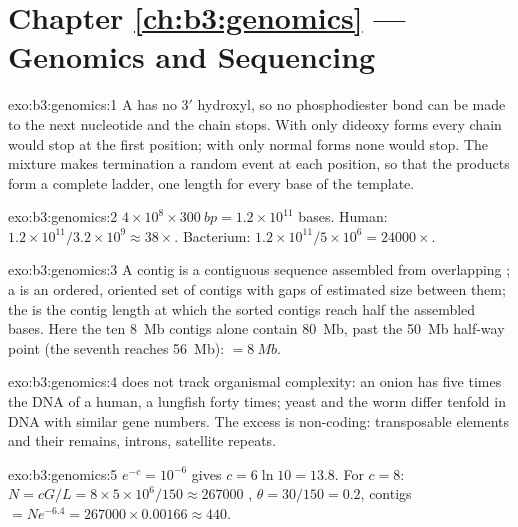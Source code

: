 \section*{Chapter \ref{ch:b3:genomics} --- Genomics and Sequencing}

\begin{solution}{exo:b3:genomics:1}
A  has no 3$'$ hydroxyl, so no phosphodiester bond
can be made to the next nucleotide and the chain stops. With only
dideoxy forms every chain would stop at the first position; with only
normal forms none would stop. The mixture makes termination a random
event at each position, so that the products form a complete ladder,
one length for every base of the template.
\end{solution}

\begin{solution}{exo:b3:genomics:2}
$4\times 10^{8}\times \qty{300}{bp} = 1.2\times 10^{11}$ bases. Human:
$1.2\times 10^{11}/3.2\times 10^{9} \approx 38\times$. Bacterium:
$1.2\times 10^{11}/5\times 10^{6} = \num{24000}\times$.
\end{solution}

\begin{solution}{exo:b3:genomics:3}
A contig is a contiguous sequence assembled from overlapping ; a
 is an ordered, oriented set of contigs with gaps of estimated
size between them; the  is the contig length at which the sorted
contigs reach half the assembled bases. Here the ten \qty{8}{Mb}
contigs alone contain \qty{80}{Mb}, past the \qty{50}{Mb} half-way
point (the seventh reaches \qty{56}{Mb}):  $= \qty{8}{Mb}$.
\end{solution}

\begin{solution}{exo:b3:genomics:4}
 does not track organismal complexity: an onion has five
times the DNA of a human, a lungfish forty times; yeast and the worm
differ tenfold in DNA with similar gene numbers. The excess is
non-coding: transposable elements and their remains, introns,
satellite repeats.
\end{solution}

\begin{solution}{exo:b3:genomics:5}
$e^{-c} = 10^{-6}$ gives $c = 6\ln 10 = 13.8$. For $c = 8$: $N =
cG/L = 8\times 5\times 10^{6}/150 \approx \num{267000}$ , $\theta
= 30/150 = 0.2$, contigs $= N e^{-6.4} = \num{267000}\times 0.00166
\approx 440$.
\end{solution}

